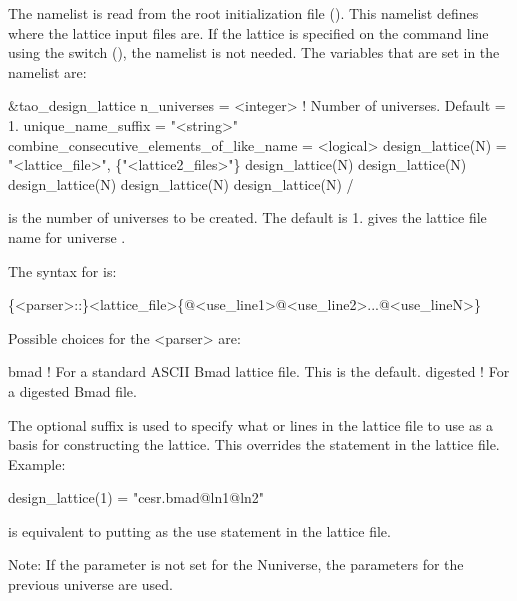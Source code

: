 The  namelist is read from the \tao root initialization file
(). This namelist defines where the lattice input files are. If the lattice is
specified on the command line using the  switch (), the
 namelist is not needed. The variables that are set in the 
namelist are:
\begin{example}
  &tao_design_lattice
    n_universes        = <integer>      ! Number of universes. Default = 1.
    unique_name_suffix = "<string>"
    combine_consecutive_elements_of_like_name = <logical>
    design_lattice(N) = "<lattice_file>", \{"<lattice2_files>"\}
    design_lattice(N)%
    design_lattice(N)%
    design_lattice(N)%
    design_lattice(N)%
    design_lattice(N)%
  /
\end{example}
 is the number of universes to be created. The default is 1.  
gives the lattice file name for universe . 

The syntax for  is:
\begin{example}
  \{<parser>::\}<lattice_file>\{@<use_line1>@<use_line2>...@<use_lineN>\}
\end{example}
Possible choices for the <parser> are:
\begin{example}
  bmad      ! For a standard ASCII Bmad lattice file. This is the default.
  digested  ! For a digested Bmad file.
\end{example}
The  optional suffix is used to specify what 
or lines in the lattice file to use as a basis for constructing the lattice. This overrides the
 statement in the lattice file. Example:
\begin{example}
  design_lattice(1) = "cesr.bmad@ln1@ln2"
\end{example}
is equivalent to putting  as the use statement in the  lattice file.

Note: If the  parameter is not set for the N\Th universe, the parameters for the
previous universe are used.

